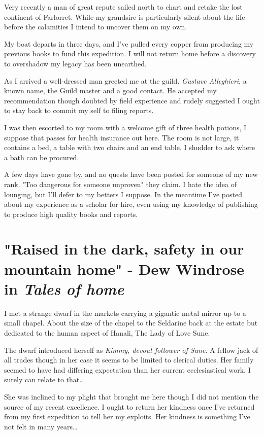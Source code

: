 \documentclass{article}
\begin{document}
Very recently a man of great repute sailed north to chart and retake the lost continent of Farlorret. While my grandsire is particularly silent about the life before the calamities I intend to uncover them on my own. 

My boat departs in three days, and I've pulled every copper from producing my previous books to fund this expedition. I will not return home before a discovery to overshadow my legacy has been unearthed.

As I arrived a well-dressed man greeted me at the guild. \textit{Gustave Alleghieri}, a known name, the Guild master and a good contact. He accepted my recommendation though doubted by field experience and rudely suggested I ought to stay back to commit my self to filing reports.

I was then escorted to my room with a welcome gift of three health potions, I suppose that passes for health insurance out here. The room is not large, it contains a bed, a table with two chairs and an end table. I shudder to ask where a bath can be procured. 

A few days have gone by, and no quests have been posted for someone of my new rank. "Too dangerous for someone unproven" they claim. I hate the idea of lounging, but I'll defer to my betters I suppose. In the meantime I've posted about my experience as a scholar for hire, even using my knowledge of publishing to produce high quality books and reports.

\section*{"Raised in the dark, safety in our mountain home" - Dew Windrose in \textit{Tales of home}}

I met a strange dwarf in the markets carrying a gigantic metal mirror up to a small chapel. About the size of the chapel to the Seldarine back at the estate but dedicated to the human aspect of Hanali, The Lady of Love Sune. 

The dwarf introduced herself as \textit{Kimmy, devout follower of Sune}. A fellow jack of all trades though in her case it seems to be limited to clerical duties. 
Her family seemed to have had differing expectation than her current ecclesiastical work. I surely can relate to that\dots

She was inclined to my plight that brought me here though I did not mention the source of my recent excellence. I ought to return her kindness once I've returned from my first expedition to tell her my exploits. Her kindness is something I've not felt in many years\dots
\end{document}
